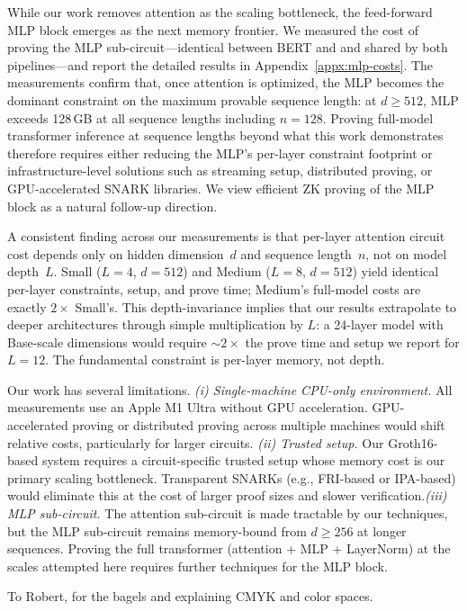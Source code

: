\documentclass[sigconf,anonymous,review,balance=false]{acmart}
\newcommand{\rev}[1]{{\color{magenta}#1}}
\begin{document}
 While our work removes attention as the scaling bottleneck, the feed-forward MLP block emerges as the next memory frontier. We measured the cost of proving the MLP sub-circuit---identical between BERT and \nystromformer and shared by both pipelines---and report the detailed results in Appendix~\ref{appx:mlp-costs}. The measurements confirm that, once attention is optimized, the MLP becomes the dominant constraint on the maximum provable sequence length: at \rev{$d{\geq}512$}, MLP exceeds 128\,GB at all sequence lengths including $n{=}128$. Proving full-model transformer inference at sequence lengths beyond what this work demonstrates therefore requires either reducing the MLP's per-layer constraint footprint or infrastructure-level solutions such as streaming setup, distributed proving, or GPU-accelerated SNARK libraries. We view efficient ZK proving of the MLP block as a natural follow-up direction.

 A consistent finding across our measurements is that per-layer attention circuit cost depends only on hidden dimension~$d$ and sequence length~$n$, not on model depth~$L$. Small ($L{=}4$, $d{=}512$) and Medium ($L{=}8$, $d{=}512$) yield identical per-layer constraints, setup, and prove time; Medium's full-model costs are exactly $2{\times}$ Small's. This depth-invariance implies that our results extrapolate to deeper architectures through simple multiplication by $L$: a 24-layer model with Base-scale dimensions would require ${\sim}2{\times}$ the prove time and setup we report for $L{=}12$. The fundamental constraint is per-layer memory, not depth.

Our work has several limitations. \emph{(i) Single-machine CPU-only environment.} All measurements use an Apple M1 Ultra without GPU acceleration. GPU-accelerated proving or distributed proving across multiple machines would shift relative costs, particularly for larger circuits. \emph{(ii) Trusted setup.} Our Groth16-based system requires a circuit-specific trusted setup whose memory cost is our primary scaling bottleneck. Transparent SNARKs (e.g., FRI-based or IPA-based) would eliminate this at the cost of larger proof sizes and slower verification.\emph{(iii) MLP sub-circuit.} The attention sub-circuit is made tractable by our techniques, but the MLP sub-circuit remains memory-bound \rev{from $d{\geq}256$ at longer sequences}. Proving the full transformer (attention + MLP + LayerNorm) at the scales attempted here requires further techniques for the MLP block.
\begin{acks}
To Robert, for the bagels and explaining CMYK and color spaces.
\end{acks}
\end{document}
